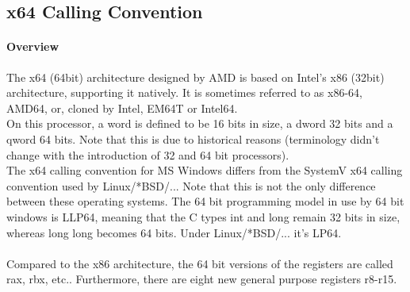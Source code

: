 %
%
%
%

\subsection{x64 Calling Convention}


\paragraph{Overview}

The x64 (64bit) architecture designed by AMD is based on Intel's x86 (32bit)
architecture, supporting it natively. It is sometimes referred to as x86-64,
AMD64, or, cloned by Intel, EM64T or Intel64.\\
On this processor, a word is defined to be 16 bits in size, a dword 32 bits
and a qword 64 bits. Note that this is due to historical reasons (terminology
didn't change with the introduction of 32 and 64 bit processors).\\
The x64 calling convention for MS Windows \cite{x64Win} differs from the
SystemV x64 calling convention \cite{x64SysV} used by Linux/*BSD/...
Note that this is not the only difference between these operating systems. The
64 bit programming model in use by 64 bit windows is LLP64, meaning that the C
types int and long remain 32 bits in size, whereas long long becomes 64 bits.
Under Linux/*BSD/... it's LP64.\\
\\
Compared to the x86 architecture, the 64 bit versions of the registers are
called rax, rbx, etc.. Furthermore, there are eight new general purpose
registers r8-r15.



